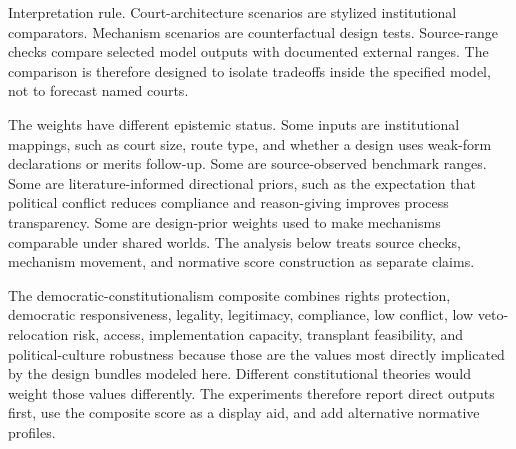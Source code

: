 \documentclass[
  journal=small,
  manuscript=research-article,
  year=2026
]{cup-journal}
\begin{document}
Interpretation rule. Court-architecture scenarios are stylized institutional comparators. Mechanism scenarios are counterfactual design tests. Source-range checks compare selected model outputs with documented external ranges. The comparison is therefore designed to isolate tradeoffs inside the specified model, not to forecast named courts.

The weights have different epistemic status. Some inputs are institutional mappings, such as court size, route type, and whether a design uses weak-form declarations or merits follow-up. Some are source-observed benchmark ranges. Some are literature-informed directional priors, such as the expectation that political conflict reduces compliance and reason-giving improves process transparency. Some are design-prior weights used to make mechanisms comparable under shared worlds. The analysis below treats source checks, mechanism movement, and normative score construction as separate claims.

The democratic-constitutionalism composite combines rights protection, democratic responsiveness, legality, legitimacy, compliance, low conflict, low veto-relocation risk, access, implementation capacity, transplant feasibility, and political-culture robustness because those are the values most directly implicated by the design bundles modeled here. Different constitutional theories would weight those values differently. The experiments therefore report direct outputs first, use the composite score as a display aid, and add alternative normative profiles.
\end{document}
